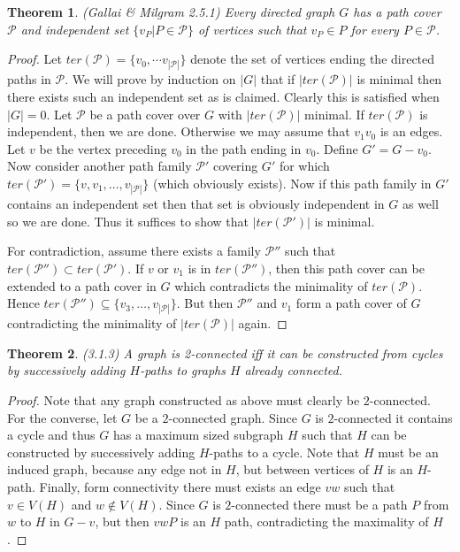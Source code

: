 \documentclass[12pt]{article}
\newtheorem{theorem}{Theorem}
\begin{document}
\begin{theorem} (Gallai \& Milgram 2.5.1) Every directed graph $G$ has
  a path cover $\mathcal{P}$ and independent set
  $\{ v_P | P \in \mathcal{P} \}$ of vertices such that $v_P \in P$
  for every $P \in \mathcal{P}$.
\end{theorem}
\begin{proof} Let
  $ter(\mathcal{P}) = \{ v_0, \cdots v_{|\mathcal{P}|} \}$ denote the
  set of vertices ending the directed paths in $\mathcal{P}$. We will
  prove by induction on $|G|$ that if $|ter(\mathcal{P})|$ is minimal
  then there exists such an independent set as is claimed. Clearly
  this is satisfied when $|G| = 0$. Let $\mathcal{P}$ be a path cover
  over $G$ with $|ter(\mathcal{P})|$ minimal. If $ter(\mathcal{P})$ is
  independent, then we are done. Otherwise we may assume that
  $v_1 v_0$ is an edges. Let $v$ be the vertex preceding $v_0$ in the
  path ending in $v_0$. Define $G' = G - v_0$. Now consider another
  path family $\mathcal{P}'$ covering $G'$ for which
  $ter(\mathcal{P'}) = \{ v, v_1, \ldots, v_{|\mathcal{P}|} \}$ (which
  obviously exists). Now if this path family in $G'$ contains an
  independent set then that set is obviously independent in $G$ as
  well so we are done. Thus it suffices to show that
  $|ter(\mathcal{P}')|$ is minimal.

  For contradiction, assume there exists a family $\mathcal{P}''$ such
  that $ter(\mathcal{P}'') \subset ter(\mathcal{P}')$. If $v$ or $v_1$
  is in $ter(\mathcal{P}'')$, then this path cover can be extended to
  a path cover in $G$ which contradicts the minimality of
  $ter(\mathcal{P})$. Hence
  $ter(\mathcal{P}'') \subseteq \{ v_3, \ldots, v_{|\mathcal{P}|}
  \}$. But then $\mathcal{P}''$ and $v_1$ form a path cover of $G$
  contradicting the minimality of $|ter(\mathcal{P})|$ again.
\end{proof}

\begin{theorem} (3.1.3) A graph is 2-connected iff it can be
  constructed from cycles by successively adding $H$-paths to graphs
  $H$ already connected.
\end{theorem}
\begin{proof} Note that any graph constructed as above must clearly be
  $2$-connected. For the converse, let $G$ be a $2$-connected
  graph. Since $G$ is $2$-connected it contains a cycle and thus $G$
  has a maximum sized subgraph $H$ such that $H$ can be constructed by
  successively adding $H$-paths to a cycle. Note that $H$ must be an
  induced graph, because any edge not in $H$, but between vertices of
  $H$ is an $H$-path. Finally, form connectivity there must exists an
  edge $vw$ such that $v \in V(H)$ and $w \notin V(H)$. Since $G$ is
  $2$-connected there must be a path $P$ from $w$ to $H$ in $G-v$, but
  then $vwP$ is an $H$ path, contradicting the maximality of $H$.
\end{proof}
\end{document}
